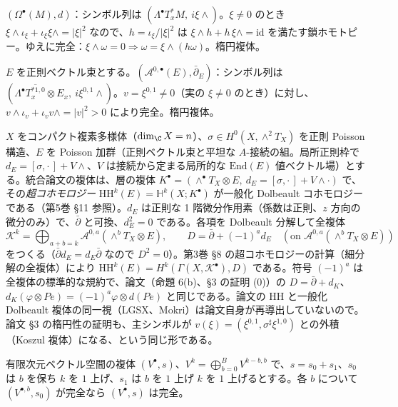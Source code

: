 \begin{ex}[de Rham 複体]\label{ex:dRcx}\tP
$(\Omega^\bullet(M),d)$：シンボル列は $(\Lambda^\bullet T_x^*M,\ i\xi\wedge)$。$\xi\ne0$ のとき $\xi\wedge\iota_\xi+\iota_\xi\xi\wedge=|\xi|^2$ なので、$h=\iota_\xi/|\xi|^2$ は $\xi\wedge h+h\,\xi\wedge=\mathrm{id}$ を満たす鎖ホモトピー。ゆえに完全：$\xi\wedge\omega=0\Rightarrow\omega=\xi\wedge(h\omega)$。楕円複体。
\end{ex}
\begin{ex}[Dolbeault 複体]\label{ex:Dolcx}\tP
$E$ を正則ベクトル束とする。$(\mathcal A^{0,\bullet}(E),\bar\partial_E)$：シンボル列は $(\Lambda^\bullet\overline{T^{*1,0}_x}\otimes E_x,\ i\xi^{0,1}\wedge)$。$v=\xi^{0,1}\neq0$（実の $\xi\ne0$ のとき）に対し、$v\wedge\iota_v+\iota_vv\wedge=|v|^2>0$ により完全。楕円複体。
\end{ex}
\begin{ex}[統合論文の複体の全複体]\label{ex:unifiedcx}
$X$ をコンパクト複素多様体（$\dim_\C X=n$）、$\sigma\in H^0(X,\wedge^2T_X)$ を正則 Poisson 構造、$E$ を Poisson 加群（正則ベクトル束と平坦な $A$-接続の組。局所正則枠で $d_E=[\sigma,\cdot\,]+V\wedge$、$V$ は接続から定まる局所的な $\mathrm{End}(E)$ 値ベクトル場）とする。統合論文の複体は、層の複体 $K^\bullet=(\wedge^\bullet T_X\otimes E,\ d_E=[\sigma,\cdot\,]+V\wedge\cdot)$ で、その\emph{超コホモロジー} $\mathrm{HH}^k(E)=\mathbb H^k(X;K^\bullet)$ が一般化 Dolbeault コホモロジーである（第5巻 \S11 参照）。$d_E$ は正則な 1 階微分作用素（係数は正則、$z$ 方向の微分のみ）で、$\bar\partial$ と可換、$d_E^2=0$ である。各項を Dolbeault 分解して全複体
\[
\mathcal K^k=\bigoplus_{a+b=k}\mathcal A^{0,a}(\wedge^bT_X\otimes E),\qquad D=\bar\partial+(-1)^a d_E\quad(\text{on }\mathcal A^{0,a}(\wedge^bT_X\otimes E))
\]
をつくる（$\bar\partial d_E=d_E\bar\partial$ なので $D^2=0$）。第3巻 \S8 の超コホモロジーの計算（細分解の全複体）により $\mathrm{HH}^k(E)=H^k(\Gamma(X,\mathcal K^\bullet),D)$ である\tC。符号 $(-1)^a$ は全複体の標準的な規約で、論文（命題 6(b)、§3 の証明 (0)）の $D=\bar\partial+d_K$、$d_K(\varphi\otimes Pe)=(-1)^a\varphi\otimes d(Pe)$ と同じである。論文の $\mathrm{HH}$ と一般化 Dolbeault 複体の同一視（LGSX、Mokri）は論文自身が再導出していないので\tQ。論文 §3 の楕円性の証明も、主シンボルが $v(\xi)=(\xi^{0,1},\sigma^\sharp\xi^{1,0})$ との外積（Koszul 複体）になる、という同じ形である。
\end{ex}
\begin{lem}[フィルトレーション補題]\label{lem:filt}\tP
有限次元ベクトル空間の複体 $(V^\bullet,s)$、$V^k=\bigoplus_{b=0}^{B}V^{k-b,b}$ で、$s=s_0+s_1$、$s_0$ は $b$ を保ち $k$ を $1$ 上げ、$s_1$ は $b$ を $1$ 上げ $k$ を $1$ 上げるとする。各 $b$ について $(V^{\bullet,b},s_0)$ が完全なら $(V^\bullet,s)$ は完全。
\end{lem}
